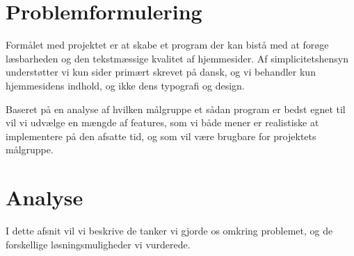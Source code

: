 \documentclass[a4paper,oneside,article]{memoir}
\begin{document}
\newpage
\chapter{Problemformulering}
\label{problemformulering}
Formålet med projektet er at skabe et program der kan bistå med at
forøge læsbarheden og den tekstmæssige kvalitet af hjemmesider. Af
simplicitetshensyn understøtter vi kun sider primært skrevet på dansk,
og vi behandler kun hjemmesidens indhold, og ikke dens typografi og
design.

Baseret på en analyse af hvilken målgruppe et sådan program er bedst
egnet til vil vi udvælge en mængde af features, som vi både mener er
realistiske at implementere på den afsatte tid, og som vil være
brugbare for projektets målgruppe.

\newpage
\chapter{Analyse}
\label{analyse}
I dette afsnit vil vi beskrive de tanker vi gjorde os omkring
problemet, og de forskellige løsningsmuligheder vi vurderede.
\end{document}
